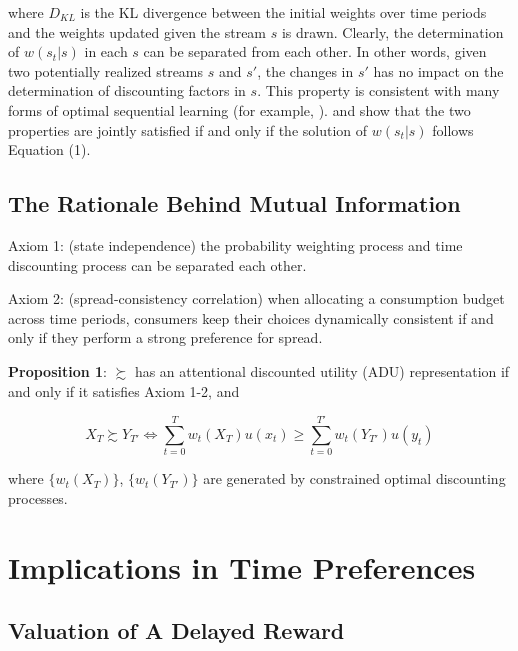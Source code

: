 \documentclass[
  12pt,
]{article}
\begin{document}
where \(D_{KL}\) is the KL divergence between the initial weights over
time periods and the weights updated given the stream \(s\) is drawn.
Clearly, the determination of \(w(s_t|s)\) in each \(s\) can be
separated from each other. In other words, given two potentially
realized streams \(s\) and \(s'\), the changes in \(s'\) has no impact
on the determination of discounting factors in \(s\). This property is
consistent with many forms of optimal sequential learning (for example,
\citet{zhong_optimal_2022} ). \citet{matejka_rational_2015} and
\citet{caplin_rationally_2022} show that the two properties are jointly
satisfied if and only if the solution of \(w(s_t|s)\) follows Equation
(1).

\hypertarget{the-rationale-behind-mutual-information}{%
\subsection{The Rationale Behind Mutual
Information}\label{the-rationale-behind-mutual-information}}

Axiom 1: (state independence) the probability weighting process and time
discounting process can be separated each other.

Axiom 2: (spread-consistency correlation) when allocating a consumption
budget across time periods, consumers keep their choices dynamically
consistent if and only if they perform a strong preference for spread.

\textbf{Proposition 1}: \(\succsim\) has an attentional discounted
utility (ADU) representation if and only if it satisfies Axiom 1-2, and

\[
X_T \succsim Y_{T'} \Longleftrightarrow \sum_{t=0}^T w_t(X_T) u(x_t)\geq \sum_{t=0}^{T'} w_t(Y_{T'}) u(y_t) 
\]

where \(\{w_t(X_T)\}\), \(\{w_t(Y_{T'})\}\) are generated by constrained
optimal discounting processes.

\hypertarget{implications-in-time-preferences}{%
\section{\texorpdfstring{Implications in Time Preferences
\label{behavioral}}{Implications in Time Preferences }}\label{implications-in-time-preferences}}

\hypertarget{valuation-of-a-delayed-reward}{%
\subsection{Valuation of A Delayed
Reward}\label{valuation-of-a-delayed-reward}}
\end{document}
